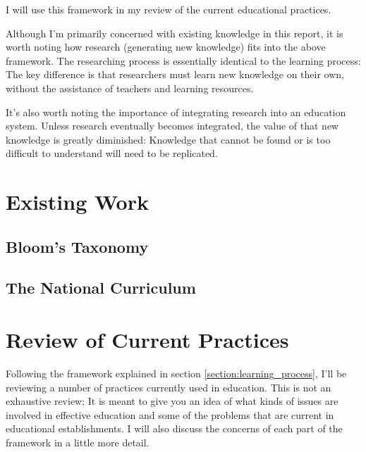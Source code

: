     I will use this framework in my review of the current educational practices.

    Although I'm primarily concerned with existing knowledge in this report, it is worth noting how research (generating new knowledge) fits into the above framework. The researching process is essentially identical to the learning process: The key difference is that researchers must learn new knowledge on their own, without the assistance of teachers and learning resources.

    It's also worth noting the importance of integrating research into an education system. Unless research eventually becomes integrated, the value of that new knowledge is greatly diminished: Knowledge that cannot be found or is too difficult to understand will need to be replicated.

  \section{Existing Work}

    \subsection{Bloom's Taxonomy}
    \subsection{The National Curriculum}

  \section{Review of Current Practices}
    Following the framework explained in section \ref{section:learning_process}, I'll be reviewing a number of practices currently used in education. This is not an exhaustive review; It is meant to give you an idea of what kinds of issues are involved in effective education and some of the problems that are current in educational establishments. I will also discuss the concerns of each part of the framework in a little more detail.

